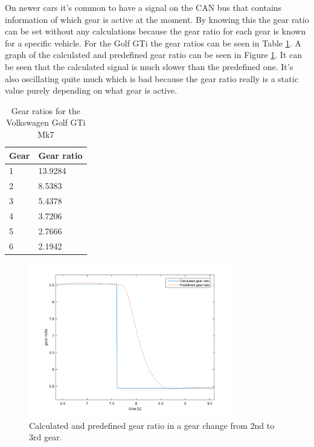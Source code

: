 On newer cars it's common to have a signal on the CAN bus that contains information of which gear is active at the moment. By knowing this the gear ratio can be set without any calculations because the gear ratio for each gear is known for a specific vehicle. For the Golf GTi the gear ratios can be seen in Table \ref{tab:gr}. A graph of the calculated and predefined gear ratio can be seen in Figure \ref{gear_ratio}. It can be seen that the calculated signal is much slower than the predefined one. It's also oscillating quite much which is bad because the gear ratio really is a static value purely depending on what gear is active. 


\begin{table}[position specifier]
	\centering
	\begin{tabular}{| l | l |}
		\hline
		Gear & Gear ratio \\ \hline
		1 & 13.9284 \\ \hline
		2 & 8.5383 \\ \hline
		3 & 5.4378 \\ \hline
		4 & 3.7206 \\ \hline
		5 & 2.7666 \\ \hline
		6 & 2.1942 \\ \hline
	\end{tabular}
	\caption{Gear ratios for the Volkswagen Golf GTi Mk7}
	\label{tab:gr}
\end{table}

\begin{figure}[h]
	\centering
	\includegraphics[width=0.8\textwidth]{Pictures/gear_ratio}
	\caption{Calculated and predefined gear ratio in a gear change from 2nd to 3rd gear.}
	\label{gear_ratio}
\end{figure}

